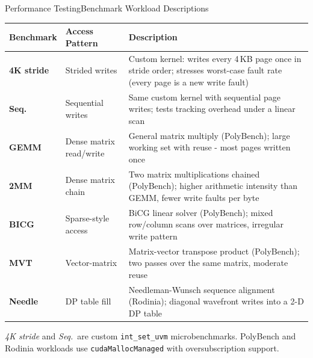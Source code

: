 \begin{frame}{Performance Testing}{Benchmark Workload Descriptions}
\vspace{-2mm}
\begin{center}
\scriptsize
\setlength{\tabcolsep}{4pt}
\begin{tabular}{lp{2.8cm}p{6.5cm}}
\toprule
\textbf{Benchmark} & \textbf{Access Pattern} & \textbf{Description} \\
\midrule
\textbf{4K stride}   & Strided writes        & Custom kernel: writes every 4\,KB page once in stride order; stresses worst-case fault rate (every page is a new write fault) \\
\textbf{Seq.}        & Sequential writes     & Same custom kernel with sequential page writes; tests tracking overhead under a linear scan \\
\textbf{GEMM}        & Dense matrix read/write & General matrix multiply (PolyBench); large working set with reuse - most pages written once \\
\textbf{2MM}         & Dense matrix chain    & Two matrix multiplications chained (PolyBench); higher arithmetic intensity than GEMM, fewer write faults per byte \\
\textbf{BICG}        & Sparse-style access   & BiCG linear solver (PolyBench); mixed row/column scans over matrices, irregular write pattern \\
\textbf{MVT}         & Vector-matrix         & Matrix-vector transpose product (PolyBench); two passes over the same matrix, moderate reuse \\
\textbf{Needle}      & DP table fill         & Needleman-Wunsch sequence alignment (Rodinia); diagonal wavefront writes into a 2-D DP table \\
\bottomrule
\end{tabular}

\vspace{1mm}
{\tiny \emph{4K stride} and \emph{Seq.}\ are custom \texttt{int\_set\_uvm} microbenchmarks.
PolyBench and Rodinia workloads use \texttt{cudaMallocManaged} with oversubscription support.}
\end{center}
\end{frame}

